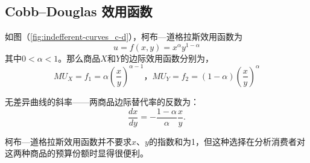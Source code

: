 \subsection[Cobb--Douglas]{Cobb--Douglas 效用函数}

如图（\ref{fig:indefferent-curves_c-d}），柯布—道格拉斯效用函数为
\begin{equation}
u=f(x,y) = x^{\alpha}y^{1-\alpha}
\label{eq:}
\end{equation}
其中$0 < \alpha < 1$。那么商品$X$和$Y$的边际效用函数分别为，
\[
MU_X=f_1=\alpha (\frac{x}{y})^{\alpha - 1} \text{，} MU_Y=f_2=(1-\alpha) (\frac{x}{y})^{\alpha}
\]

无差异曲线的斜率——两商品边际替代率的反数为：
\[\frac{dx}{dy} = - \frac{1 - \alpha}{\alpha} \frac{x}{y}.\]

柯布—道格拉斯效用函数并不要求$x$、$y$的指数和为1，但这种选择在分析消费者对这两种商品的预算份额时显得很便利。

